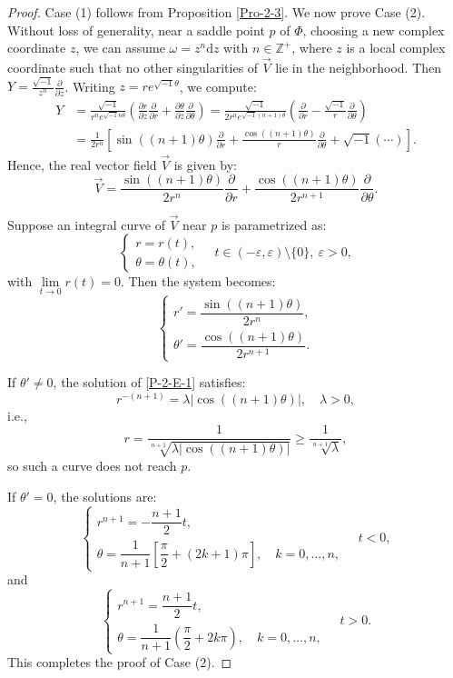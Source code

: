 \documentclass[microtype]{gtpart}     %
\theoremstyle{definition}
\begin{document}
\begin{proof}
Case (1) follows from Proposition \ref{Pro-2-3}. We now prove Case (2). Without loss of generality, near a saddle point $p$ of $\Phi$, choosing a new complex coordinate $z$, we can assume $\omega = z^n \mathrm{d}z$ with $n \in \mathbb{Z}^{+}$, where $z$ is a local complex coordinate such that no other singularities of $\vec{V}$ lie in the neighborhood. Then $Y = \frac{\sqrt{-1}}{z^n} \frac{\partial}{\partial z}$. Writing $z = r e^{\sqrt{-1}\theta}$, we compute:
\begin{align*}
Y &= \frac{\sqrt{-1}}{r^n e^{\sqrt{-1}n\theta}} \left( \frac{\partial r}{\partial z} \frac{\partial}{\partial r} + \frac{\partial \theta}{\partial z} \frac{\partial}{\partial \theta} \right)
= \frac{\sqrt{-1}}{2 r^n e^{\sqrt{-1}(n+1)\theta}} \left( \frac{\partial}{\partial r} - \frac{\sqrt{-1}}{r} \frac{\partial}{\partial \theta} \right) \\
&= \frac{1}{2 r^n} \left[ \sin((n+1)\theta) \frac{\partial}{\partial r} + \frac{\cos((n+1)\theta)}{r} \frac{\partial}{\partial \theta} + \sqrt{-1}(\cdots) \right].
\end{align*}
Hence, the real vector field $\vec{V}$ is given by:
\[
\vec{V} = \frac{\sin((n+1)\theta)}{2 r^n} \frac{\partial}{\partial r} + \frac{\cos((n+1)\theta)}{2 r^{n+1}} \frac{\partial}{\partial \theta}.
\]

Suppose an integral curve of $\vec{V}$ near $p$ is parametrized as:
\[
\begin{cases}
r = r(t), \\
\theta = \theta(t),
\end{cases}
\quad t \in (-\varepsilon, \varepsilon) \setminus \{0\},\ \varepsilon > 0,
\]
with $\lim\limits_{t \to 0} r(t) = 0$. Then the system becomes:
\begin{equation}\label{P-2-E-1}
\begin{cases}
r' = \dfrac{\sin((n+1)\theta)}{2 r^n}, \\[10pt]
\theta' = \dfrac{\cos((n+1)\theta)}{2 r^{n+1}}.
\end{cases}
\end{equation}

If $\theta' \neq 0$, the solution of \eqref{P-2-E-1} satisfies:
\[
r^{-(n+1)} = \lambda |\cos((n+1)\theta)|, \quad \lambda > 0,
\]
i.e.,
\[
r = \frac{1}{\sqrt[n+1]{\lambda |\cos((n+1)\theta)|}} \geq \frac{1}{\sqrt[n+1]{\lambda}},
\]
so such a curve does not reach $p$.

If $\theta' = 0$, the solutions are:
\[
\begin{cases}
r^{n+1} = -\dfrac{n+1}{2} t, \\
\theta = \dfrac{1}{n+1} \left[ \dfrac{\pi}{2} + (2k+1)\pi \right], \quad k = 0, \ldots, n,
\end{cases}
\quad t < 0,
\]
and
\[
\begin{cases}
r^{n+1} = \dfrac{n+1}{2} t, \\
\theta = \dfrac{1}{n+1} \left( \dfrac{\pi}{2} + 2k\pi \right), \quad k = 0, \ldots, n,
\end{cases}
\quad t > 0.
\]
This completes the proof of Case (2).
\end{proof}
\end{document}
